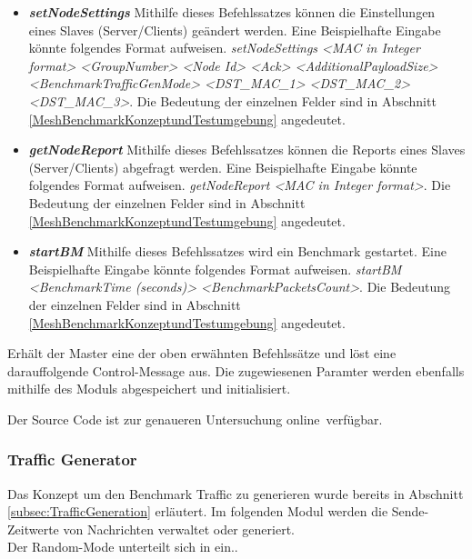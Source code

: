 \begin{itemize}
	\item \textit{\textbf{setNodeSettings}} Mithilfe dieses Befehlssatzes können die Einstellungen eines Slaves (Server/Clients) geändert werden. Eine Beispielhafte Eingabe könnte folgendes Format aufweisen. 
	\textit{setNodeSettings <MAC in Integer format> <GroupNumber> <Node Id> <Ack> <AdditionalPayloadSize> <BenchmarkTrafficGenMode> <DST\_MAC\_1> 
	<DST\_MAC\_2> <DST\_MAC\_3>}. Die Bedeutung der einzelnen Felder sind in Abschnitt \ref{MeshBenchmarkKonzeptundTestumgebung} angedeutet.
	\item \textit{\textbf{getNodeReport}} Mithilfe dieses Befehlssatzes können die Reports eines Slaves (Server/Clients) abgefragt werden. Eine Beispielhafte Eingabe könnte folgendes Format aufweisen. 
	\textit{getNodeReport <MAC in Integer format>}. Die Bedeutung der einzelnen Felder sind in Abschnitt \ref{MeshBenchmarkKonzeptundTestumgebung} angedeutet. 
	\item \textit{\textbf{startBM}} Mithilfe dieses Befehlssatzes wird ein Benchmark gestartet. Eine Beispielhafte Eingabe könnte folgendes Format aufweisen. 
	\textit{startBM <BenchmarkTime (seconds)> <BenchmarkPacketsCount>}. Die Bedeutung der einzelnen Felder sind in Abschnitt \ref{MeshBenchmarkKonzeptundTestumgebung} angedeutet. 
\end{itemize}

Erhält der Master eine der oben erwähnten Befehlssätze und löst eine darauffolgende Control-Message aus. Die zugewiesenen Paramter werden ebenfalls mithilfe des Moduls abgespeichert und initialisiert. 

Der Source Code ist zur genaueren Untersuchung online\footnotemark\ verfügbar. 


\subsubsection{Traffic Generator}\label{subsubsec:TrafficGenerator}

Das Konzept um den Benchmark Traffic zu generieren wurde bereits in Abschnitt \ref{subsec:TrafficGeneration} erläutert. Im folgenden Modul werden die Sende-Zeitwerte von Nachrichten verwaltet oder generiert. \\

Der Random-Mode unterteilt sich in ein..

